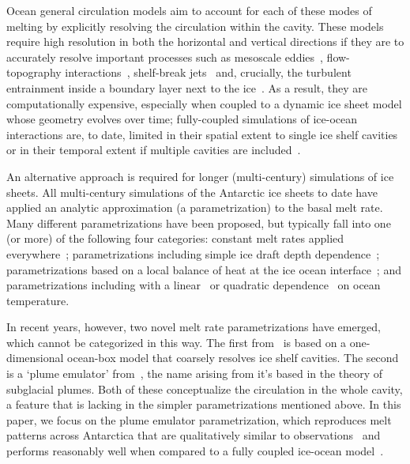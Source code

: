 \documentclass[openacc]{rsproca_new}%
\begin{document}
Ocean general circulation models aim to account for each of these modes of melting by explicitly resolving the circulation within the cavity. These models require high resolution in both the horizontal and vertical directions if they are to accurately resolve important processes such as mesoscale eddies~\citep{Stewart2015GRL}, flow-topography interactions~\citep{Nakayama2014OceanModelling}, shelf-break jets~\citep{Graham2016JGeophysResOceans} and, crucially, the turbulent entrainment inside a boundary layer next to the ice~\citep{Kimura2014JPhysOcean, Xu2012AnnGlac}. As a result, they are computationally expensive, especially when coupled to a dynamic ice sheet model whose geometry evolves over time; fully-coupled simulations of ice-ocean interactions are, to date, limited in their spatial extent to single ice shelf cavities~\citep[e.g.][]{DeRydt2016JGeophysResEarthSurf, Seroussi2017GRL} or in their temporal extent if multiple cavities are included~\citep[e.g.][]{Mathiot2017GeosciModDev,Naughten2018JClim}.

An alternative approach is required for longer (multi-century) simulations of ice sheets. All multi-century simulations of the Antarctic ice sheets to date have applied an analytic approximation (a parametrization) to the basal melt rate. Many different parametrizations have been proposed, but typically fall into one (or more) of the following four categories: constant melt rates applied everywhere~\citep[e.g.][]{Arthern2017GRL}; parametrizations including simple ice draft depth dependence~\citep[e.g.][]{Joughin2014Science}; parametrizations based on a local balance of heat at the ice ocean interface~\citep[e.g][]{Golledge2015Nature}; and parametrizations including with a linear~\citep[e.g.][]{Favier2016Cryo} or quadratic dependence~\citep[e.g.][]{Holland2008JClimate,DeConto2016Nature} on ocean temperature.

In recent years, however, two novel melt rate parametrizations have emerged, which cannot be categorized in this way. The first from~\cite{Reese2018Cryo} is based on a one-dimensional ocean-box model that coarsely resolves ice shelf cavities. The second is a `plume emulator' from~\cite{Lazeroms2018TheCryo}, the name arising from it's based in the theory of subglacial plumes. Both of these conceptualize the circulation in the whole cavity, a feature that is lacking in the simpler parametrizations mentioned above. In this paper, we focus on the plume emulator parametrization, which reproduces melt patterns across Antarctica that are qualitatively similar to observations~\citep{Lazeroms2018TheCryo} and performs reasonably well when compared to a fully coupled ice-ocean model~\citep{Favier2019GeosciModDev}.
\end{document}
